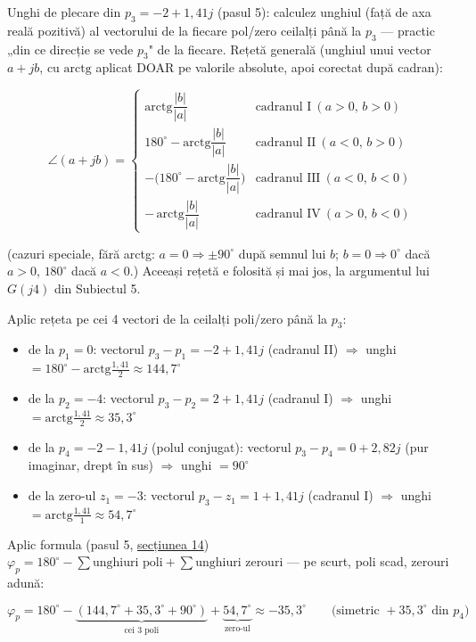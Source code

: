 \documentclass[10pt,a4paper]{article}
\begin{document}
Unghi de plecare din $p_3{=}{-}2{+}1{,}41j$ (pasul 5): calculez unghiul (față de axa reală pozitivă) al vectorului de la fiecare pol/zero ceilalți până la $p_3$ — practic „din ce direcție se vede $p_3$" de la fiecare. Rețetă generală (unghiul unui vector $a+jb$, cu $\mathrm{arctg}$ aplicat DOAR pe valorile absolute, apoi corectat după cadran):
\begin{keyeq}\color{red!65!black}
$$\angle(a+jb)=\begin{cases}
\mathrm{arctg}\dfrac{|b|}{|a|} & \text{cadranul I}\ (a{>}0,\,b{>}0)\\[5pt]
180^\circ-\mathrm{arctg}\dfrac{|b|}{|a|} & \text{cadranul II}\ (a{<}0,\,b{>}0)\\[5pt]
-\Big(180^\circ-\mathrm{arctg}\dfrac{|b|}{|a|}\Big) & \text{cadranul III}\ (a{<}0,\,b{<}0)\\[5pt]
-\,\mathrm{arctg}\dfrac{|b|}{|a|} & \text{cadranul IV}\ (a{>}0,\,b{<}0)
\end{cases}$$
\end{keyeq}
(cazuri speciale, fără arctg: $a{=}0\Rightarrow\pm90^\circ$ după semnul lui $b$; $b{=}0\Rightarrow0^\circ$ dacă $a{>}0$, $180^\circ$ dacă $a{<}0$.) Aceeași rețetă e folosită și mai jos, la argumentul lui $G(j4)$ din Subiectul 5.

Aplic rețeta pe cei 4 vectori de la ceilalți poli/zero până la $p_3$:
\begin{itemize}
\item de la $p_1{=}0$: vectorul $p_3{-}p_1{=}{-}2{+}1{,}41j$ (cadranul II) $\Rightarrow$ unghi $=180^\circ-\mathrm{arctg}\tfrac{1,41}2\approx144{,}7^\circ$
\item de la $p_2{=}{-}4$: vectorul $p_3{-}p_2{=}2{+}1{,}41j$ (cadranul I) $\Rightarrow$ unghi $=\mathrm{arctg}\tfrac{1,41}2\approx35{,}3^\circ$
\item de la $p_4{=}{-}2{-}1{,}41j$ (polul conjugat): vectorul $p_3{-}p_4{=}0{+}2{,}82j$ (pur imaginar, drept în sus) $\Rightarrow$ unghi $=90^\circ$
\item de la zero-ul $z_1{=}{-}3$: vectorul $p_3{-}z_1{=}1{+}1{,}41j$ (cadranul I) $\Rightarrow$ unghi $=\mathrm{arctg}\tfrac{1,41}1\approx54{,}7^\circ$
\end{itemize}
Aplic formula (pasul 5, \hyperref[sec:14]{secțiunea 14}) $\varphi_p{=}180^\circ{-}\sum\text{unghiuri poli}{+}\sum\text{unghiuri zerouri}$ — pe scurt, poli scad, zerouri adună:
\begin{keyeq}\color{red!65!black}
$$\varphi_p=180^\circ-\underbrace{(144{,}7^\circ+35{,}3^\circ+90^\circ)}_{\text{cei 3 poli}}+\underbrace{54{,}7^\circ}_{\text{zero-ul}}\approx-35{,}3^\circ\qquad\text{(simetric }+35{,}3^\circ\text{ din }p_4\text{)}$$
\end{keyeq}
\end{document}
